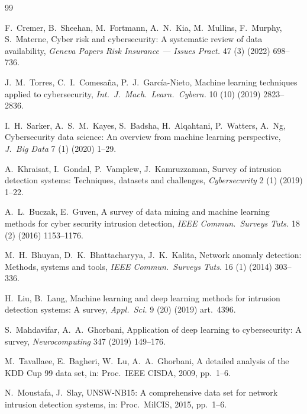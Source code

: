 \documentclass[preprint,12pt,authoryear]{elsarticle}
\begin{document}
\begin{thebibliography}{99}

F.~Cremer, B.~Sheehan, M.~Fortmann, A.~N.~Kia, M.~Mullins, F.~Murphy, S.~Materne,
Cyber risk and cybersecurity: A systematic review of data availability,
\textit{Geneva Papers Risk Insurance --- Issues Pract.} 47 (3) (2022) 698--736.

J.~M.~Torres, C.~I.~Comesa\~na, P.~J.~Garc\'ia-Nieto, Machine learning techniques
applied to cybersecurity, \textit{Int.\ J.\ Mach.\ Learn.\ Cybern.} 10 (10) (2019)
2823--2836.

I.~H.~Sarker, A.~S.~M.~Kayes, S.~Badsha, H.~Alqahtani, P.~Watters, A.~Ng,
Cybersecurity data science: An overview from machine learning perspective,
\textit{J.\ Big Data} 7 (1) (2020) 1--29.

A.~Khraisat, I.~Gondal, P.~Vamplew, J.~Kamruzzaman, Survey of intrusion detection
systems: Techniques, datasets and challenges, \textit{Cybersecurity} 2 (1) (2019)
1--22.

A.~L.~Buczak, E.~Guven, A survey of data mining and machine learning methods for
cyber security intrusion detection, \textit{IEEE Commun.\ Surveys Tuts.} 18 (2)
(2016) 1153--1176.

M.~H.~Bhuyan, D.~K.~Bhattacharyya, J.~K.~Kalita, Network anomaly detection:
Methods, systems and tools, \textit{IEEE Commun.\ Surveys Tuts.} 16 (1) (2014)
303--336.

H.~Liu, B.~Lang, Machine learning and deep learning methods for intrusion
detection systems: A survey, \textit{Appl.\ Sci.} 9 (20) (2019) art.~4396.

S.~Mahdavifar, A.~A.~Ghorbani, Application of deep learning to cybersecurity: A
survey, \textit{Neurocomputing} 347 (2019) 149--176.

M.~Tavallaee, E.~Bagheri, W.~Lu, A.~A.~Ghorbani, A detailed analysis of the KDD
Cup 99 data set, in: Proc.\ IEEE CISDA, 2009, pp.~1--6.

N.~Moustafa, J.~Slay, UNSW-NB15: A comprehensive data set for network intrusion
detection systems, in: Proc.\ MilCIS, 2015, pp.~1--6.


\end{thebibliography}
\end{document}
